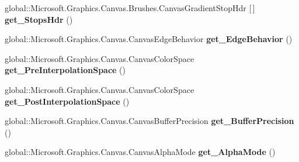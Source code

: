 \begin{DoxyCompactItemize}
\item 
\mbox{\label{class_microsoft_1_1_graphics_1_1_canvas_1_1_brushes_1_1_canvas_linear_gradient_brush_ae3b9a2022af08e1af2ef533bdf9ae164}} 
global\+::\+Microsoft.\+Graphics.\+Canvas.\+Brushes.\+Canvas\+Gradient\+Stop\+Hdr \mbox{[}$\,$\mbox{]} {\bfseries get\+\_\+\+Stops\+Hdr} ()
\item 
\mbox{\label{class_microsoft_1_1_graphics_1_1_canvas_1_1_brushes_1_1_canvas_linear_gradient_brush_ac53e2151cbaede69b2072192ba7af46f}} 
global\+::\+Microsoft.\+Graphics.\+Canvas.\+Canvas\+Edge\+Behavior {\bfseries get\+\_\+\+Edge\+Behavior} ()
\item 
\mbox{\label{class_microsoft_1_1_graphics_1_1_canvas_1_1_brushes_1_1_canvas_linear_gradient_brush_ae768f664c240426af7715b7aadf47101}} 
global\+::\+Microsoft.\+Graphics.\+Canvas.\+Canvas\+Color\+Space {\bfseries get\+\_\+\+Pre\+Interpolation\+Space} ()
\item 
\mbox{\label{class_microsoft_1_1_graphics_1_1_canvas_1_1_brushes_1_1_canvas_linear_gradient_brush_a83d5f9d271cffb836af96b6da7aa38fa}} 
global\+::\+Microsoft.\+Graphics.\+Canvas.\+Canvas\+Color\+Space {\bfseries get\+\_\+\+Post\+Interpolation\+Space} ()
\item 
\mbox{\label{class_microsoft_1_1_graphics_1_1_canvas_1_1_brushes_1_1_canvas_linear_gradient_brush_a1fdb7f1a72634524c8a485a1ca69bd02}} 
global\+::\+Microsoft.\+Graphics.\+Canvas.\+Canvas\+Buffer\+Precision {\bfseries get\+\_\+\+Buffer\+Precision} ()
\item 
\mbox{\label{class_microsoft_1_1_graphics_1_1_canvas_1_1_brushes_1_1_canvas_linear_gradient_brush_ac8d376e678069dd7666b39fc75c7fc79}} 
global\+::\+Microsoft.\+Graphics.\+Canvas.\+Canvas\+Alpha\+Mode {\bfseries get\+\_\+\+Alpha\+Mode} ()
\item 

\end{DoxyCompactItemize}
